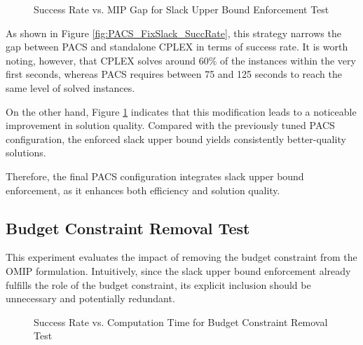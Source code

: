 \begin{figure}[H]
\centering
\begin{minipage}{0.6\columnwidth}
\centering
\resizebox{\linewidth}{!}{}
\end{minipage}%
\hfill
\begin{minipage}{0.4\columnwidth}
\centering
\resizebox{\linewidth}{!}{}
\end{minipage}
\caption{Success Rate vs. MIP Gap for Slack Upper Bound Enforcement Test}
\label{fig:PACS_FixSlack_MGAP}
\end{figure}

As shown in Figure \ref{fig:PACS_FixSlack_SuccRate}, this strategy narrows the gap between PACS and standalone CPLEX in terms of success rate. It is worth noting, however, that CPLEX solves around 60\% of the instances within the very first seconds, whereas PACS requires between 75 and 125 seconds to reach the same level of solved instances.

On the other hand, Figure \ref{fig:PACS_FixSlack_MGAP} indicates that this modification leads to a noticeable improvement in solution quality. Compared with the previously tuned PACS configuration, the enforced slack upper bound yields consistently better-quality solutions.

Therefore, the final PACS configuration integrates slack upper bound enforcement, as it enhances both efficiency and solution quality.

\subsection{Budget Constraint Removal Test}\label{sec:test_bdg_constr}
This experiment evaluates the impact of removing the budget constraint from the OMIP formulation. Intuitively, since the slack upper bound enforcement already fulfills the role of the budget constraint, its explicit inclusion should be unnecessary and potentially redundant.

\begin{figure}[H]
\centering
\begin{minipage}{0.6\columnwidth}
\centering
\resizebox{\linewidth}{!}{}
\end{minipage}%
\hfill
\begin{minipage}{0.4\columnwidth}
\centering
\resizebox{\linewidth}{!}{}
\end{minipage}
\caption{Success Rate vs. Computation Time for Budget Constraint Removal Test}
\label{fig:PACS_BDGRem_SuccRate}
\end{figure}

